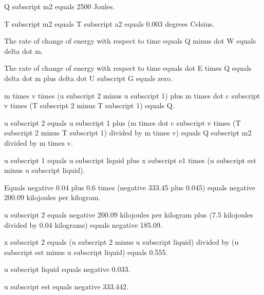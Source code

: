 Q subscript m2 equals 2500 Joules.

T subscript m2 equals T subscript a2 equals 0.003 degrees Celsius.

The rate of change of energy with respect to time equals Q minus dot W equals delta dot m.

The rate of change of energy with respect to time equals dot E times Q equals delta dot m plus delta dot U subscript G equals zero.

m times v times (u subscript 2 minus u subscript 1) plus m times dot c subscript v times (T subscript 2 minus T subscript 1) equals Q.

u subscript 2 equals u subscript 1 plus (m times dot c subscript v times (T subscript 2 minus T subscript 1) divided by m times v) equals Q subscript m2 divided by m times v.

u subscript 1 equals u subscript liquid plus x subscript e1 times (u subscript est minus u subscript liquid).

Equals negative 0.04 plus 0.6 times (negative 333.45 plus 0.045) equals negative 200.09 kilojoules per kilogram.

u subscript 2 equals negative 200.09 kilojoules per kilogram plus (7.5 kilojoules divided by 0.04 kilograms) equals negative 185.09.

x subscript 2 equals (u subscript 2 minus u subscript liquid) divided by (u subscript est minus u subscript liquid) equals 0.555.

u subscript liquid equals negative 0.033.

u subscript est equals negative 333.442.
